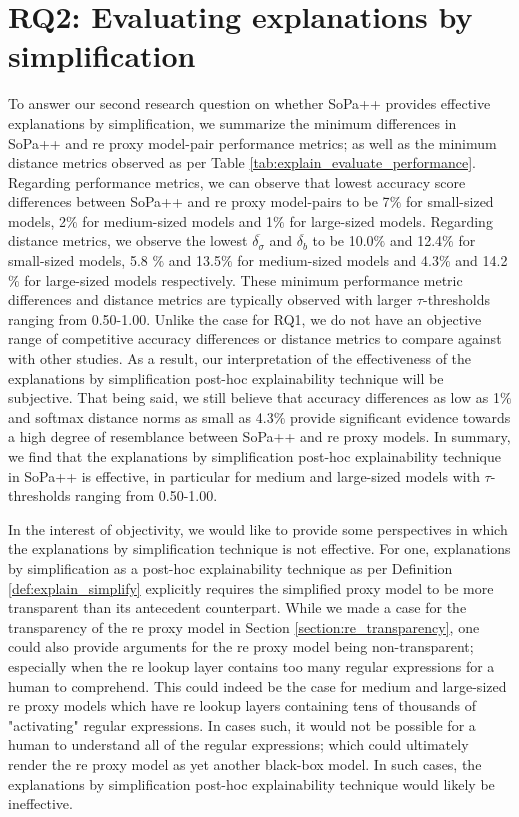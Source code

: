 \section{RQ2: Evaluating explanations by simplification}

To answer our second research question on whether SoPa++ provides effective
explanations by simplification, we summarize the minimum differences in SoPa++
and \ac{re} proxy model-pair performance metrics; as well as the minimum distance
metrics observed as per Table \ref{tab:explain_evaluate_performance}. Regarding
performance metrics, we can observe that lowest accuracy score differences
between SoPa++ and \ac{re} proxy model-pairs to be 7$\%$ for small-sized models, 2$\%$
for medium-sized models and 1$\%$ for large-sized models. Regarding distance
metrics, we observe the lowest $\overline{\delta_{\sigma}}$ and
$\overline{\delta_{b}}$ to be 10.0$\%$ and 12.4$\%$ for small-sized models, 5.8
$\%$ and 13.5$\%$ for medium-sized models and 4.3$\%$ and 14.2$\%$ for
large-sized models respectively. These minimum performance metric differences
and distance metrics are typically observed with larger $\tau$-thresholds
ranging from 0.50-1.00. Unlike the case for RQ1, we do not have an objective
range of competitive accuracy differences or distance metrics to compare against
with other studies. As a result, our interpretation of the effectiveness of the
explanations by simplification post-hoc explainability technique will be
subjective. That being said, we still believe that accuracy differences as low
as 1$\%$ and softmax distance norms as small as 4.3$\%$ provide significant
evidence towards a high degree of resemblance between SoPa++ and \ac{re} proxy
models. In summary, we find that the explanations by simplification post-hoc
explainability technique in SoPa++ is effective, in particular for medium and
large-sized models with $\tau$-thresholds ranging from 0.50-1.00.

In the interest of objectivity, we would like to provide some perspectives in
which the explanations by simplification technique is not effective. For one,
explanations by simplification as a post-hoc explainability technique as per
Definition \ref{def:explain_simplify} explicitly requires the simplified proxy
model to be more transparent than its antecedent counterpart. While we made a
case for the transparency of the \ac{re} proxy model in Section
\ref{section:re_transparency}, one could also provide arguments for the \ac{re} proxy
model being non-transparent; especially when the \ac{re} lookup layer contains too
many regular expressions for a human to comprehend. This could indeed be the
case for medium and large-sized \ac{re} proxy models which have \ac{re} lookup layers
containing tens of thousands of "activating" regular expressions. In cases such,
it would not be possible for a human to understand all of the regular
expressions; which could ultimately render the \ac{re} proxy model as yet another
black-box model. In such cases, the explanations by simplification post-hoc
explainability technique would likely be ineffective.

